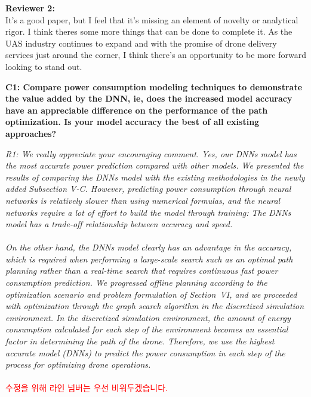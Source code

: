 \documentclass[onecolumn]{IEEEconf}
\begin{document}
\textbf{\large Reviewer 2:}\\
It's a good paper, but I feel that it's missing an element of novelty or analytical rigor.  I think theres some more things that can be done to complete it.
As the UAS industry continues to expand and with the promise of drone delivery services just around the corner, I think there's an opportunity to be more forward looking to stand out.
\begin{description}
    \item \textbf
	{
	C1: Compare power consumption modeling techniques to demonstrate the value added by the DNN, ie, does the increased model accuracy have an appreciable difference on the performance of the path optimization. Is your model accuracy the best of all existing approaches? 
	}
	\item \textit
	{
	R1: We really appreciate your encouraging comment. Yes, our DNNs model has the most accurate power prediction compared with other models. We presented the results of comparing the DNNs model with the existing methodologies in the newly added Subsection V-C.
    However, predicting power consumption through neural networks is relatively slower than using numerical formulas, and the neural networks require a lot of effort to build the model through training: The DNNs model has a trade-off relationship between accuracy and speed.
    ~\\~\\
    On the other hand, the DNNs model clearly has an advantage in the accuracy, which is required when performing a large-scale search such as an optimal path planning rather than a real-time search that requires continuous fast power consumption prediction.
    We progressed offline planning according to the optimization scenario and problem formulation of Section~VI, and we proceeded with optimization through the graph search algorithm in the discretized simulation environment.
    In the discretized simulation environment, the amount of energy consumption calculated for each step of the environment becomes an essential factor in determining the path of the drone.
    Therefore, we use the highest accurate model (DNNs) to predict the power consumption in each step of the process for optimizing drone operations.
	}
	~\\
    ~\\
    \textcolor{red}{수정을 위해 라인 넘버는 우선 비워두겠습니다.}\\

\end{description}
\end{document}
